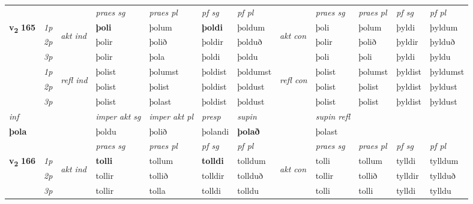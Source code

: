 \begin{longtable}[l]{X>{\footnotesize\itshape}llXXXXlXXXX}
\midrule

 & &   & \textit{praes sg}  & \textit{praes pl}    & \textit{ pf sg} & \textit{pf pl} & & \textit{praes sg}  & \textit{praes pl}    & \textit{pf sg} & \textit{pf pl }  \\ \cmidrule{4-7} \cmidrule{9-12}
 \multirow{2}{*}{{{\textbf{v{\textsubscript{2}}} \Large{\textbf{165}}}}}  & 1p & \multirow{3}{*}{\begin{turn}{90}\textit{akt ind}\end{turn}} & \textbf{þoli} & þolum & \textbf{þoldi} & þoldum & \multirow{3}{*}{\begin{turn}{90}\textit{akt con}\end{turn}} &þoli & þolum & þyldi & þyldum\\*
 & 2p &  &  þolir  & þolið & þoldir & þolduð & & þolir & þolið & þyldir & þylduð \\*
 & 3p &  & þolir & þola & þoldi & þoldu & & þoli & þoli& þyldi & þyldu \\*
\cmidrule{4-7} \cmidrule{9-12}
 & 1p & \multirow{3}{*}{\begin{turn}{90}\textit{refl ind}\end{turn}}  & þolist & þolumst & þoldist & þoldumst & \multirow{3}{*}{\begin{turn}{90}\textit{refl con}\end{turn}}  &þolist & þolumst & þyldist & þyldumst \\*
 & 2p &  & þolist & þolist & þoldist & þoldust & &þolist & þolist & þyldist & þyldust \\*
 & 3p  & & þolist & þolast & þoldist & þoldust & & þolist & þolist& þyldist & þyldust \\*
\cmidrule{4-7} \cmidrule{9-12}

   {\textit{inf}} & &  & \textit{imper akt sg} & \textit{imper akt pl}   & \textit{presp} & \textit{supin} && \textit{supin refl}  \\*
  {\textbf{þola}} & && þoldu  & þolið   & þolandi &  \textbf{þolað} && þolast  \\*

\midrule

 & &   & \textit{praes sg}  & \textit{praes pl}    & \textit{ pf sg} & \textit{pf pl} & & \textit{praes sg}  & \textit{praes pl}    & \textit{pf sg} & \textit{pf pl }  \\ \cmidrule{4-7} \cmidrule{9-12}
 \multirow{2}{*}{{{\textbf{v{\textsubscript{2}}} \Large{\textbf{166}}}}}  & 1p & \multirow{3}{*}{\begin{turn}{90}\textit{akt ind}\end{turn}} & \textbf{tolli} & tollum & \textbf{tolldi} & tolldum & \multirow{3}{*}{\begin{turn}{90}\textit{akt con}\end{turn}} &tolli & tollum & tylldi & tylldum\\*
 & 2p &  &  tollir  & tollið & tolldir & tollduð & & tollir & tollið & tylldir & tyllduð \\*
 & 3p &  & tollir & tolla & tolldi & tolldu & & tolli & tolli& tylldi & tylldu \\*
\cmidrule{4-7} \cmidrule{9-12}


\end{longtable}
